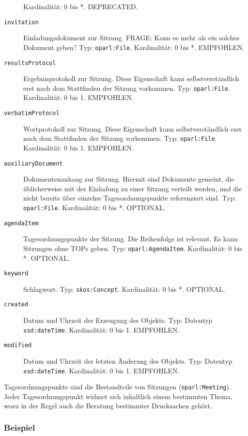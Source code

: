 \documentclass[,a4paper]{article}
\begin{document}
\begin{description}
Kardinalität: 0 bis *. DEPRECATED.
\item[\texttt{invitation}]
Einladungsdokument zur Sitzung. FRAGE: Kann es mehr als ein solches
Dokument geben? Typ: \texttt{oparl:File}. Kardinalität: 0 bis *.
EMPFOHLEN.
\item[\texttt{resultsProtocol}]
Ergebnisprotokoll zur Sitzung. Diese Eigenschaft kann selbstverständlich
erst nach dem Stattfinden der Sitzung vorkommen. Typ:
\texttt{oparl:File}. Kardinalität: 0 bis 1. EMPFOHLEN.
\item[\texttt{verbatimProtocol}]
Wortprotokoll zur Sitzung. Diese Eigenschaft kann selbstverständlich
erst nach dem Stattfinden der Sitzung vorkommen. Typ:
\texttt{oparl:File}. Kardinalität: 0 bis 1. EMPFOHLEN.
\item[\texttt{auxiliaryDocument}]
Dokumentenanhang zur Sitzung. Hiermit sind Dokumente gemeint, die
üblicherweise mit der Einladung zu einer Sitzung verteilt werden, und
die nicht bereits über einzelne Tagesordnungspunkte referenziert sind.
Typ: \texttt{oparl:File}. Kardinalität: 0 bis *. OPTIONAL.
\item[\texttt{agendaItem}]
Tagesordnungspunkte der Sitzung. Die Reihenfolge ist relevant. Es kann
Sitzungen ohne TOPs geben. Typ: \texttt{oparl:AgendaItem}. Kardinalität:
0 bis *. OPTIONAL.
\item[\texttt{keyword}]
Schlagwort. Typ: \texttt{skos:Concept}. Kardinalität: 0 bis *. OPTIONAL.
\item[\texttt{created}]
Datum und Uhrzeit der Erzeugung des Objekts. Typ: Datentyp
\texttt{xsd:dateTime}. Kardinalität: 0 bis 1. EMPFOHLEN.
\item[\texttt{modified}]
Datum und Uhrzeit der letzten Änderung des Objekts. Typ: Datentyp
\texttt{xsd:dateTime}. Kardinalität: 0 bis 1. EMPFOHLEN.
\end{description}


Tagesordnungspunkte sind die Bestandteile von Sitzungen
(\texttt{oparl:Meeting}). Jeder Tagesordnungspunkt widmet sich
inhaltlich einem bestimmten Thema, wozu in der Regel auch die Beratung
bestimmter Drucksachen gehört.

\subsubsection{Beispiel}\label{beispiel-5}
\end{document}
